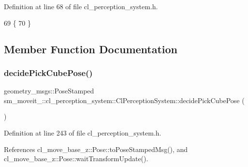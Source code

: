 Definition at line 68 of file cl\+\_\+perception\+\_\+system.\+h.


\begin{DoxyCode}
69   \{
70   \}
\end{DoxyCode}


\subsection{Member Function Documentation}
\mbox{\label{classsm__moveit__3_1_1cl__perception__system_1_1ClPerceptionSystem_accc2813b1da308e9a71bec317db4590d}} 
\subsubsection{\texorpdfstring{decide\+Pick\+Cube\+Pose()}{decidePickCubePose()}}
{\footnotesize\ttfamily geometry\+\_\+msgs\+::\+Pose\+Stamped sm\+\_\+moveit\+\_\+::cl\+\_\+perception\+\_\+system\+::\+Cl\+Perception\+System\+::decide\+Pick\+Cube\+Pose (\begin{DoxyParamCaption}{ }\end{DoxyParamCaption})\hspace{0.3cm}{\ttfamily [inline]}}



Definition at line 243 of file cl\+\_\+perception\+\_\+system.\+h.



References cl\+\_\+move\+\_\+base\+\_\+z\+::\+Pose\+::to\+Pose\+Stamped\+Msg(), and cl\+\_\+move\+\_\+base\+\_\+z\+::\+Pose\+::wait\+Transform\+Update().


